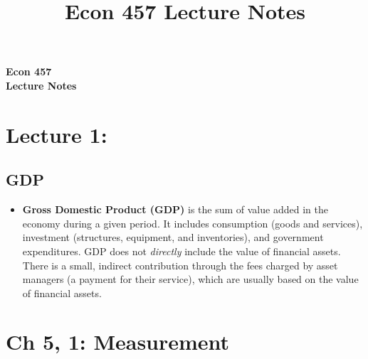 \documentclass[11pt]{article}
\theoremstyle{definition}
\newtheorem{defn}{Definition}
\newtheorem{note}{Note}
\begin{document}
\setcounter{section}{0}
\title{Econ 457 Lecture Notes}

\thispagestyle{empty}




\begin{center}
{\LARGE \bf Econ 457}\\
{\bf Lecture Notes}\\
\end{center}

\section{Lecture 1:}
\subsection{GDP}

\begin{itemize}
\item \textbf{Gross Domestic Product (GDP)} is the sum of value added in the economy during a given period.   It includes consumption (goods and services), investment (structures, equipment, and inventories), and government expenditures.  GDP does not \textit{directly} include the value of financial assets.   There is a small, indirect contribution through the fees charged by asset managers (a payment for their service), which are usually based on the value of financial assets.
\end{itemize}


\section{ Ch 5, 1: Measurement}
\end{document}
